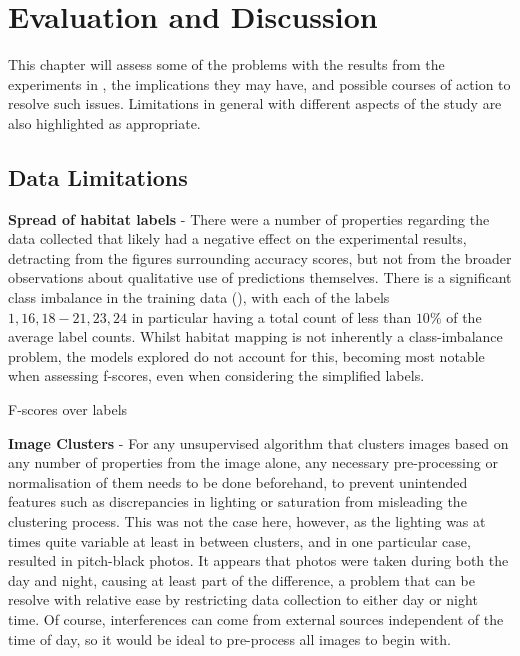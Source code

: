 \chapter{Evaluation and Discussion} \label{chap:evaluation}

This chapter will assess some of the problems with the results from the experiments in , the implications they may have, and possible courses of action to resolve such issues. Limitations in general with different aspects of the study are also highlighted as appropriate.

\section{Data Limitations}

\textbf{Spread of habitat labels} - There were a number of properties regarding the data collected that likely had a negative effect on the experimental results, detracting from the figures surrounding accuracy scores, but not from the broader observations about qualitative use of predictions themselves. There is a significant class imbalance in the training data (), with each of the labels $1, 16, 18-21, 23, 24$ in particular having a total count of less than $10\%$ of the average label counts. Whilst habitat mapping is not inherently a class-imbalance problem, the models explored do not account for this, becoming most notable when assessing f-scores, even when considering the simplified labels.

\begin{table}[H]
    \caption{F-scores over labels}
\end{table}

\textbf{Image Clusters} - For any unsupervised algorithm that clusters images based on any number of properties from the image alone, any necessary pre-processing or normalisation of them needs to be done beforehand, to prevent unintended features such as discrepancies in lighting or saturation from misleading the clustering process. This was not the case here, however, as the lighting was at times quite variable at least in between clusters, and in one particular case, resulted in pitch-black photos. It appears that photos were taken during both the day and night, causing at least part of the difference, a problem that can be resolve with relative ease by restricting data collection to either day or night time. Of course, interferences can come from external sources independent of the time of day, so it would be ideal to pre-process all images to begin with. 

